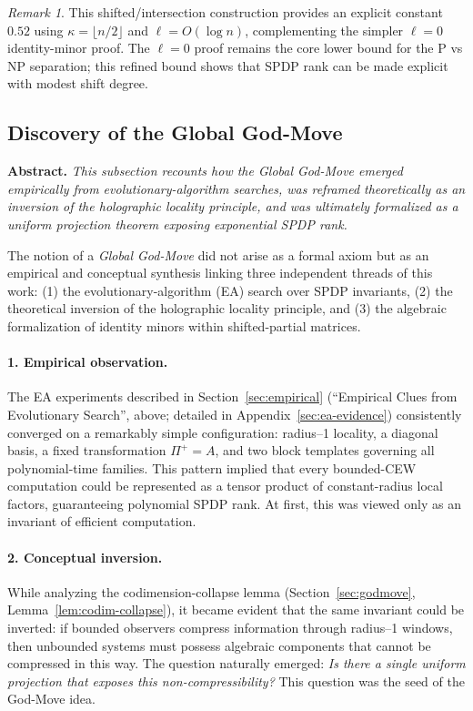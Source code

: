 \documentclass[12pt]{article}
\theoremstyle{definition}
\theoremstyle{definition}
\theoremstyle{remark}
\newtheorem{remark}{Remark}
\theoremstyle{remark}
\begin{document}
\begin{remark}
This shifted/intersection construction provides an explicit constant $0.52$ using $\kappa = \lfloor n/2 \rfloor$ and $\ell = O(\log n)$, complementing the simpler $\ell = 0$ identity-minor proof. The $\ell = 0$ proof remains the core lower bound for the P vs NP separation; this refined bound shows that SPDP rank can be made explicit with modest shift degree.
\end{remark}


\subsection{Discovery of the Global God-Move}\label{sec:discovery-godmove}

\textbf{Abstract.}
\textit{This subsection recounts how the Global God-Move emerged empirically from evolutionary-algorithm searches, was reframed theoretically as an inversion of the holographic locality principle, and was ultimately formalized as a uniform projection theorem exposing exponential SPDP rank.}

\medskip

The notion of a \emph{Global God-Move} did not arise as a formal axiom but as an empirical
and conceptual synthesis linking three independent threads of this work:
(1) the evolutionary-algorithm (EA) search over SPDP invariants,
(2) the theoretical inversion of the holographic locality principle,
and (3) the algebraic formalization of identity minors within shifted-partial matrices.

\paragraph{1. Empirical observation.}
The EA experiments described in Section~\ref{sec:empirical} (``Empirical Clues from Evolutionary Search'', above; detailed in Appendix~\ref{sec:ea-evidence}) consistently converged on
a remarkably simple configuration:
radius--1 locality, a diagonal basis, a fixed transformation $\Pi^+=A$,
and two block templates governing all polynomial-time families.
This pattern implied that every bounded-CEW computation could be represented as
a tensor product of constant-radius local factors, guaranteeing polynomial SPDP rank.
At first, this was viewed only as an invariant of efficient computation.

\paragraph{2. Conceptual inversion.}
While analyzing the codimension-collapse lemma (Section~\ref{sec:godmove}, Lemma~\ref{lem:codim-collapse}),
it became evident that the same invariant could be inverted:
if bounded observers compress information through radius--1 windows,
then unbounded systems must possess algebraic components that cannot be compressed in this way.
The question naturally emerged:
\emph{Is there a single uniform projection that exposes this non-compressibility?}
This question was the seed of the God-Move idea.
\end{document}
